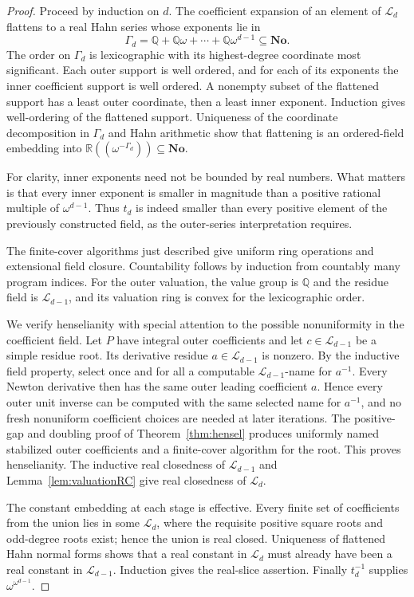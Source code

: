 \documentclass[11pt,letterpaper]{article}
\numberwithin{equation}{section}
\theoremstyle{definition}
\theoremstyle{remark}
\newcommand{\No}{\mathbf{No}}
\newcommand{\Q}{\mathbb Q}
\newcommand{\R}{\mathbb R}
\begin{document}
\begin{proof}
Proceed by induction on $d$. The coefficient expansion of an element of
$\mathcal L_d$ flattens to a real Hahn series whose exponents lie in
\[
 \Gamma_d=\Q+\Q\omega+\cdots+\Q\omega^{d-1}\subseteq\No.
\]
The order on $\Gamma_d$ is lexicographic with its highest-degree
coordinate most significant. Each outer support is well ordered, and for
each of its exponents the inner coefficient support is well ordered.
A nonempty subset of the flattened support has a least outer coordinate,
then a least inner exponent. Induction gives well-ordering of the flattened
support. Uniqueness of the coordinate decomposition in $\Gamma_d$ and
Hahn arithmetic show that flattening is an ordered-field embedding into
$\R((\omega^{-\Gamma_d}))\subseteq\No$.

For clarity, inner exponents need not be bounded by real numbers. What
matters is that every inner exponent is smaller in magnitude than a
positive rational multiple of $\omega^{d-1}$. Thus $t_d$ is indeed smaller
than every positive element of the previously constructed field, as the
outer-series interpretation requires.

The finite-cover algorithms just described give uniform ring operations
and extensional field closure. Countability follows by induction from
countably many program indices. For the outer valuation, the value group
is $\Q$ and the residue field is $\mathcal L_{d-1}$, and its valuation ring is
convex for the lexicographic order.

We verify henselianity with special attention to the possible nonuniformity
in the coefficient field. Let $P$ have integral outer coefficients and
let $c\in \mathcal L_{d-1}$ be a simple residue root. Its derivative residue
$a\in \mathcal L_{d-1}$ is nonzero. By the inductive field property, select once
and for all a computable $\mathcal L_{d-1}$-name for $a^{-1}$. Every Newton
derivative then has the same outer leading coefficient $a$. Hence every
outer unit inverse can be computed with the same selected name for
$a^{-1}$, and no fresh nonuniform coefficient choices are needed at later
iterations. The positive-gap and doubling proof of
Theorem~\ref{thm:hensel} produces uniformly named stabilized outer
coefficients and a finite-cover algorithm for the root. This proves
henselianity. The inductive real closedness of $\mathcal L_{d-1}$ and
Lemma~\ref{lem:valuationRC} give real closedness of $\mathcal L_d$.

The constant embedding at each stage is effective. Every finite set of
coefficients from the union lies in some $\mathcal L_d$, where the requisite
positive square roots and odd-degree roots exist; hence the union is real
closed. Uniqueness of flattened Hahn normal forms shows that a real
constant in $\mathcal L_d$ must already have been a real constant in $\mathcal L_{d-1}$.
Induction gives the real-slice assertion. Finally $t_d^{-1}$ supplies
$\omega^{\omega^{d-1}}$.
\end{proof}
\end{document}
